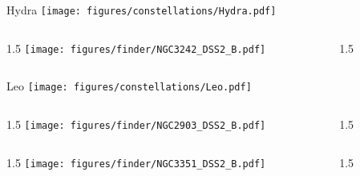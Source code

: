 \documentclass[final]{beamer}
\newlength{\colwidth}
\begin{document}

\begin{frame}[t]{\LARGE Hydra}
    \centering
    \texttt{[image: figures/constellations/Hydra.pdf]}
\end{frame}


\begin{frame}[t]{}
    \begin{columns}[T]
        \begin{column}{1.5\colwidth}
            \centering
            \texttt{[image: figures/finder/NGC3242\_DSS2\_B.pdf]}
        \end{column}
        \begin{column}{1.5\colwidth}
            \Large
            
        \end{column}
    \end{columns}
    \vspace{\fill}
\end{frame}


\begin{frame}[t]{\LARGE Leo}
    \centering
    \texttt{[image: figures/constellations/Leo.pdf]}
\end{frame}


\begin{frame}[t]{}
    \begin{columns}[T]
        \begin{column}{1.5\colwidth}
            \centering
            \texttt{[image: figures/finder/NGC2903\_DSS2\_B.pdf]}
        \end{column}
        \begin{column}{1.5\colwidth}
            \Large
            
        \end{column}
    \end{columns}
    \vspace{\fill}
    \begin{columns}[T]
        \begin{column}{1.5\colwidth}
            \centering
            \texttt{[image: figures/finder/NGC3351\_DSS2\_B.pdf]}
        \end{column}
        \begin{column}{1.5\colwidth}
            \Large
            
        \end{column}
    \end{columns}
\end{frame}
\end{document}
